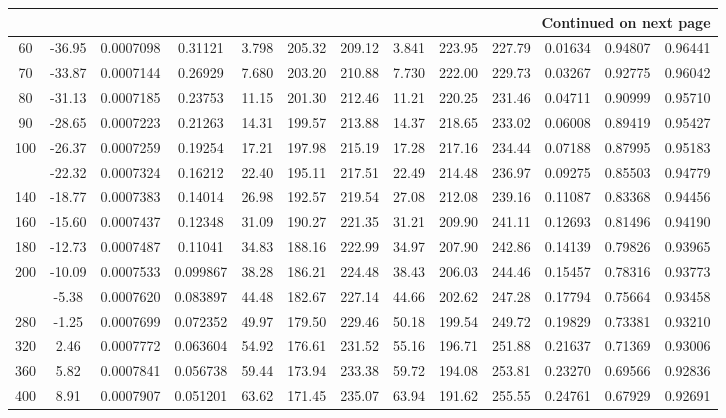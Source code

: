 \documentclass[12pt,a3paper]{article}
\begin{document}
\begin{enumerate}
\begin{center}
\begin{longtable}{c c c c c c c c c c c c c}
\midrule
\multicolumn{13}{r}{{Continued on next page}} \\
\bottomrule
\endfoot

\bottomrule\bottomrule
\endlastfoot

60 & -36.95 & 0.0007098 & 0.31121 & 3.798 & 205.32 & 209.12 & 3.841 & 223.95 & 227.79 & 0.01634 & 0.94807 & 0.96441 \\
70 & -33.87 & 0.0007144 & 0.26929 & 7.680 & 203.20 & 210.88 & 7.730 & 222.00 & 229.73 & 0.03267 & 0.92775 & 0.96042 \\
80 & -31.13 & 0.0007185 & 0.23753 & 11.15 & 201.30 & 212.46 & 11.21 & 220.25 & 231.46 & 0.04711 & 0.90999 & 0.95710 \\
90 & -28.65 & 0.0007223 & 0.21263 & 14.31 & 199.57 & 213.88 & 14.37 & 218.65 & 233.02 & 0.06008 & 0.89419 & 0.95427 \\
100 & -26.37 & 0.0007259 & 0.19254 & 17.21 & 197.98 & 215.19 & 17.28 & 217.16 & 234.44 & 0.07188 & 0.87995 & 0.95183 \\
\addlinespace
120 & -22.32 & 0.0007324 & 0.16212 & 22.40 & 195.11 & 217.51 & 22.49 & 214.48 & 236.97 & 0.09275 & 0.85503 & 0.94779 \\
140 & -18.77 & 0.0007383 & 0.14014 & 26.98 & 192.57 & 219.54 & 27.08 & 212.08 & 239.16 & 0.11087 & 0.83368 & 0.94456 \\
160 & -15.60 & 0.0007437 & 0.12348 & 31.09 & 190.27 & 221.35 & 31.21 & 209.90 & 241.11 & 0.12693 & 0.81496 & 0.94190 \\
180 & -12.73 & 0.0007487 & 0.11041 & 34.83 & 188.16 & 222.99 & 34.97 & 207.90 & 242.86 & 0.14139 & 0.79826 & 0.93965 \\
200 & -10.09 & 0.0007533 & 0.099867 & 38.28 & 186.21 & 224.48 & 38.43 & 206.03 & 244.46 & 0.15457 & 0.78316 & 0.93773 \\
\addlinespace
240 & -5.38 & 0.0007620 & 0.083897 & 44.48 & 182.67 & 227.14 & 44.66 & 202.62 & 247.28 & 0.17794 & 0.75664 & 0.93458 \\
280 & -1.25 & 0.0007699 & 0.072352 & 49.97 & 179.50 & 229.46 & 50.18 & 199.54 & 249.72 & 0.19829 & 0.73381 & 0.93210 \\
320 & 2.46 & 0.0007772 & 0.063604 & 54.92 & 176.61 & 231.52 & 55.16 & 196.71 & 251.88 & 0.21637 & 0.71369 & 0.93006 \\
360 & 5.82 & 0.0007841 & 0.056738 & 59.44 & 173.94 & 233.38 & 59.72 & 194.08 & 253.81 & 0.23270 & 0.69566 & 0.92836 \\
400 & 8.91 & 0.0007907 & 0.051201 & 63.62 & 171.45 & 235.07 & 63.94 & 191.62 & 255.55 & 0.24761 & 0.67929 & 0.92691 \\

\end{longtable}
\end{center}
\end{enumerate}
\end{document}
